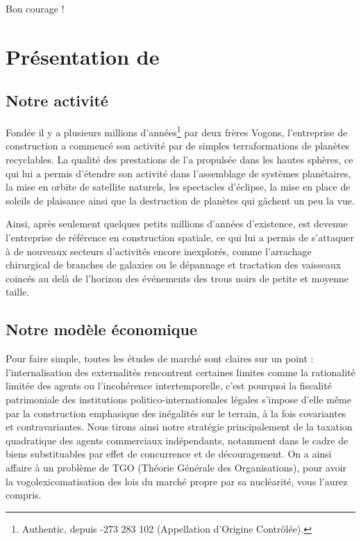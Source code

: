 Bon courage !

\newpage

\section{Présentation de \provogon{}}

\subsection{Notre activité}

Fondée il y a plusieurs millions d'années\footnote{\provogon{} Authentic,
depuis -273 283 102 (Appellation d'Origine Contrôlée).} par deux frères Vogons,
l'entreprise de construction \provogon{} a commencé son activité par de simples
terraformations de planètes recyclables.  La qualité des prestations de
\provogon{} l'a propulsée dans les hautes sphères, ce qui lui a permis
d'étendre son activité dans l'assemblage de systèmes planétaires, la mise en
orbite de satellite naturels, les spectacles d'éclipse, la mise en place de
soleils de plaisance ainsi que la destruction de planètes qui gâchent un peu la
vue.

Ainsi, après seulement quelques petits millions d'années d'existence, \provogon{}
est devenue l'entreprise de référence en construction spatiale, ce qui lui a
permis de s'attaquer à de nouveaux secteurs d'activités encore inexplorés,
comme l'arrachage chirurgical de branches de galaxies ou le dépannage et
tractation des vaisseaux coincés au delà de l'horizon des événements des trous
noirs de petite et moyenne taille.

\subsection{Notre modèle économique}

Pour faire simple, toutes les études de marché sont claires sur un point :
l'internalisation des externalités rencontrent certaines limites comme la
rationalité limitée des agents ou l'incohérence intertemporelle, c'est pourquoi
la fiscalité patrimoniale des institutions politico-internationales légales
s'impose d'elle même par la construction emphasique des inégalités sur le
terrain, à la fois covariantes et contravariantes. Nous tirons ainsi notre
stratégie principalement de la taxation quadratique des agents commerciaux
indépendants, notamment dans le cadre de biens substituables par effet de
concurrence et de découragement. On a ainsi affaire à un problème de TGO
(Théorie Générale des Organisations), pour avoir la vogolexicomatisation des
lois du marché propre par sa nucléarité, vous l'aurez compris.

